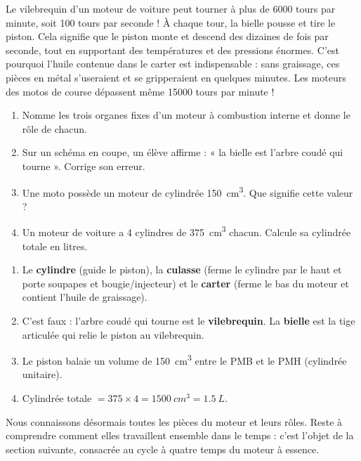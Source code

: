 \documentclass[11pt]{article}
\begin{document}
\begin{savaistu}
Le vilebrequin d'un moteur de voiture peut tourner à plus de \num{6000} tours par minute, soit 100 tours par seconde ! À chaque tour, la bielle pousse et tire le piston. Cela signifie que le piston monte et descend des dizaines de fois par seconde, tout en supportant des températures et des pressions énormes. C'est pourquoi l'huile contenue dans le carter est indispensable : sans graissage, ces pièces en métal s'useraient et se gripperaient en quelques minutes. Les moteurs des motos de course dépassent même \num{15000} tours par minute !
\end{savaistu}

\begin{exercice}
\begin{enumerate}
\item Nomme les trois organes fixes d'un moteur à combustion interne et donne le rôle de chacun.
\item Sur un schéma en coupe, un élève affirme : « la bielle est l'arbre coudé qui tourne ». Corrige son erreur.
\item Une moto possède un moteur de cylindrée \SI{150}{cm^3}. Que signifie cette valeur ?
\item Un moteur de voiture a 4 cylindres de \SI{375}{cm^3} chacun. Calcule sa cylindrée totale en litres.
\end{enumerate}
\end{exercice}

\begin{corrige}
\begin{enumerate}
\item Le \textbf{cylindre} (guide le piston), la \textbf{culasse} (ferme le cylindre par le haut et porte soupapes et bougie/injecteur) et le \textbf{carter} (ferme le bas du moteur et contient l'huile de graissage).
\item C'est faux : l'arbre coudé qui tourne est le \textbf{vilebrequin}. La \textbf{bielle} est la tige articulée qui relie le piston au vilebrequin.
\item Le piston balaie un volume de \SI{150}{cm^3} entre le PMB et le PMH (cylindrée unitaire).
\item Cylindrée totale $= 375 \times 4 = \SI{1500}{cm^3} = \SI{1,5}{L}$.
\end{enumerate}
\end{corrige}

Nous connaissons désormais toutes les pièces du moteur et leurs rôles. Reste à comprendre comment elles travaillent ensemble dans le temps : c'est l'objet de la section suivante, consacrée au cycle à quatre temps du moteur à essence.
\end{document}
